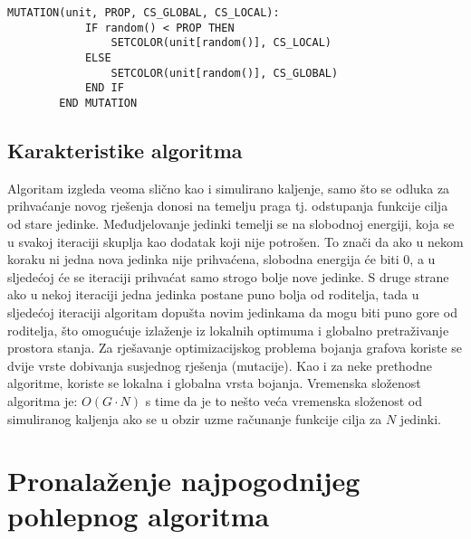 \documentclass[times, utf8, diplomski, numeric]{fer}
\begin{document}
\begin{singlespace}
	\begin{lstlisting}[caption=Pseudok\^{o}d mutacije genetskog kaljenja]
		MUTATION(unit, PROP, CS_GLOBAL, CS_LOCAL):
			IF random() < PROP THEN
				SETCOLOR(unit[random()], CS_LOCAL)				
			ELSE
				SETCOLOR(unit[random()], CS_GLOBAL)
			END IF
		END MUTATION
	\end{lstlisting}
\end{singlespace}


\subsection{Karakteristike algoritma}

Algoritam izgleda veoma slično kao i simulirano kaljenje, samo što se odluka za prihvaćanje novog rješenja donosi na temelju praga tj. odstupanja funkcije cilja od stare jedinke. Međudjelovanje jedinki temelji se na slobodnoj energiji, koja se u svakoj iteraciji skuplja kao dodatak koji nije potrošen. To znači da ako u nekom koraku ni jedna nova jedinka nije prihvaćena, slobodna energija će biti $0$, a u sljedećoj će se iteraciji prihvaćat samo strogo bolje nove jedinke. S druge strane ako u nekoj iteraciji jedna jedinka postane puno bolja od roditelja, tada u sljedećoj iteraciji algoritam dopušta novim jedinkama da mogu biti puno gore od roditelja, što omogućuje izlaženje iz lokalnih optimuma i globalno pretraživanje prostora stanja. Za rješavanje optimizacijskog problema bojanja grafova koriste se dvije vrste dobivanja susjednog rješenja (mutacije). Kao i za neke prethodne algoritme, koriste se lokalna i globalna vrsta bojanja.  
Vremenska složenost algoritma je: $O(G \cdot N)$ s time da je to nešto veća vremenska složenost od simuliranog kaljenja ako se u obzir uzme računanje funkcije cilja za $N$ jedinki.

\section{Pronalaženje najpogodnijeg pohlepnog algoritma}
\end{document}

